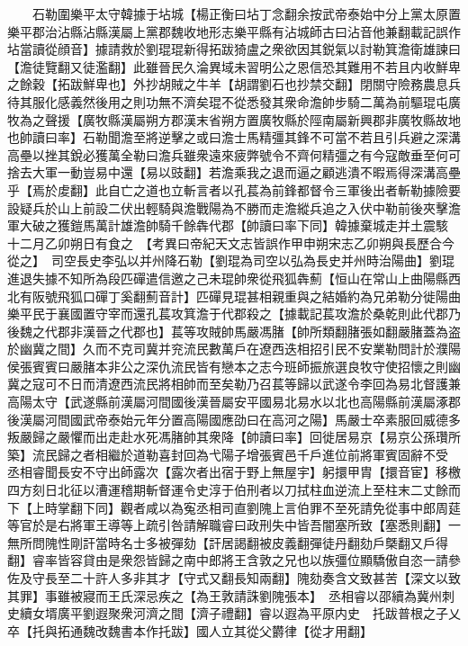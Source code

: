 　　石勒圍樂平太守韓據于坫城【楊正衡曰坫丁念翻余按武帝泰始中分上黨太原置樂平郡治沾縣沾縣漢屬上黨郡魏收地形志樂平縣有沾城師古曰沾音他兼翻載記誤作坫當讀從顔音】據請救於劉琨琨新得拓跋猗盧之衆欲因其鋭氣以討勒箕澹衛雄諫曰【澹徒覽翻又徒濫翻】此雖晉民久淪異域未習明公之恩信恐其難用不若且内收鮮卑之餘穀【拓跋鮮卑也】外抄胡賊之牛羊【胡謂劉石也抄禁交翻】閉關守險務農息兵待其服化感義然後用之則功無不濟矣琨不從悉發其衆命澹帥步騎二萬為前驅琨屯廣牧為之聲援【廣牧縣漢屬朔方郡漢末省朔方置廣牧縣於陘南屬新興郡非廣牧縣故地也帥讀曰率】石勒聞澹至將逆擊之或曰澹士馬精彊其鋒不可當不若且引兵避之深溝高壘以挫其銳必獲萬全勒曰澹兵雖衆遠來疲弊號令不齊何精彊之有今寇敵垂至何可捨去大軍一動豈易中還【易以豉翻】若澹乘我之退而逼之顧逃潰不暇焉得深溝高壘乎【焉於䖍翻】此自亡之道也立斬言者以孔萇為前鋒都督令三軍後出者斬勒據險要設疑兵於山上前設二伏出輕騎與澹戰陽為不勝而走澹縱兵追之入伏中勒前後夾擊澹軍大破之獲鎧馬萬計雄澹帥騎千餘犇代郡【帥讀曰率下同】韓據棄城走并土震駭　十二月乙卯朔日有食之　【考異曰帝紀天文志皆誤作甲申朔宋志乙卯朔與長歷合今從之】　司空長史李弘以并州降石勒【劉琨為司空以弘為長史并州時治陽曲】劉琨進退失據不知所為段匹磾遣信邀之己未琨帥衆從飛狐犇薊【恒山在常山上曲陽縣西北有阪號飛狐口磾丁奚翻薊音計】匹磾見琨甚相親重與之結婚約為兄弟勒分徙陽曲樂平民于襄國置守宰而還孔萇攻箕澹于代郡殺之【據載記萇攻澹於桑乾則此代郡乃後魏之代郡非漢晉之代郡也】萇等攻賊帥馬嚴馮䐗【帥所類翻䐗張如翻嚴䐗蓋為盗於幽冀之間】久而不克司冀并兖流民數萬戶在遼西迭相招引民不安業勒問計於濮陽侯張賓賓曰嚴䐗本非公之深仇流民皆有戀本之志今班師振旅選良牧守使招懷之則幽冀之寇可不日而清遼西流民將相帥而至矣勒乃召萇等歸以武遂令李回為易北督護兼高陽太守【武遂縣前漢屬河間國後漢晉屬安平國易北易水以北也高陽縣前漢屬涿郡後漢屬河間國武帝泰始元年分置高陽國應劭曰在高河之陽】馬嚴士卒素服回威德多叛嚴歸之嚴懼而出走赴水死馮䐗帥其衆降【帥讀曰率】回徙居易京【易京公孫瓚所築】流民歸之者相繼於道勒喜封回為弋陽子增張賓邑千戶進位前將軍賓固辭不受　丞相睿聞長安不守出師露次【露次者出宿于野上無屋宇】躬擐甲胄【擐音宦】移檄四方刻日北征以漕運稽期斬督運令史淳于伯刑者以刀拭柱血逆流上至柱末二丈餘而下【上時掌翻下同】觀者咸以為寃丞相司直劉隗上言伯罪不至死請免從事中郎周莚等官於是右將軍王導等上疏引咎請解職睿曰政刑失中皆吾闇塞所致【塞悉則翻】一無所問隗性剛訐當時名士多被彈劾【訐居謁翻被皮義翻彈徒丹翻劾戶槩翻又戶得翻】睿率皆容貸由是衆怨皆歸之南中郎將王含敦之兄也以族彊位顯驕傲自恣一請參佐及守長至二十許人多非其才【守式又翻長知兩翻】隗劾奏含文致甚苦【深文以致其罪】事雖被寢而王氏深忌疾之【為王敦請誅劉隗張本】　丞相睿以邵續為冀州刺史續女壻廣平劉遐聚衆河濟之間【濟子禮翻】睿以遐為平原内史　托跋普根之子乂卒【托與拓通魏改魏書本作托跋】國人立其從父欝律【從才用翻】

